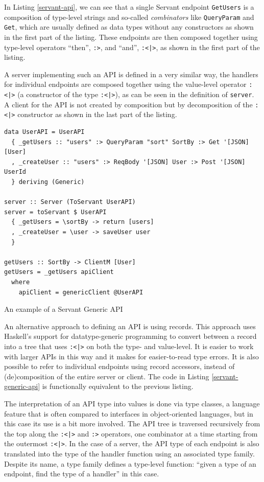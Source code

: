 \documentclass[english,zadani,odsaz]{fitthesis}
\begin{document}
In Listing \ref{servant-api}, we can see that a single Servant endpoint \texttt{GetUsers} is a
composition of type-level strings and so-called \emph{combinators} like \texttt{QueryParam} and
\texttt{Get}, which are usually defined as data types without any constructors as shown
in the first part of the listing. These endpoints are then composed together
using type-level operators ``then'', \texttt{:>}, and ``and'', \texttt{:<|>}, as shown in the first part
of the listing.

A server implementing such an API is defined in a very similar way, the handlers
for individual endpoints are composed together using the value-level operator
\texttt{:<|>} (a constructor of the type \texttt{:<|>}), as can be seen in the definition of
\texttt{server}. A client for the API is not created by composition but by decomposition
of the \texttt{:<|>} constructor as shown in the last part of the listing.

\begin{listing}[!bp]
\begin{verbatim}
data UserAPI = UserAPI
  { _getUsers :: "users" :> QueryParam "sort" SortBy :> Get '[JSON] [User]
  , _createUser :: "users" :> ReqBody '[JSON] User :> Post '[JSON] UserId
  } deriving (Generic)

server :: Server (ToServant UserAPI)
server = toServant $ UserAPI
  { _getUsers = \sortBy -> return [users]
  , _createUser = \user -> saveUser user
  }

getUsers :: SortBy -> ClientM [User]
getUsers = _getUsers apiClient
  where
    apiClient = genericClient @UserAPI
\end{verbatim}
\caption{An example of a Servant Generic API \label{servant-generic-api}}
\end{listing}

An alternative approach to defining an API is using records. This approach uses
Haskell's support for datatype-generic programming to convert between a record
into a tree that uses \texttt{:<|>} on both the type- and value-level. It is easier to
work with larger APIs in this way and it makes for easier-to-read type
errors. It is also possible to refer to individual endpoints using record
accessors, instead of (de)composition of the entire server or client. The code
in Listing \ref{servant-generic-api} is functionally equivalent to the previous listing.

The interpretation of an API type into values is done via type classes, a
language feature that is often compared to interfaces in object-oriented
languages, but in this case its use is a bit more involved. The API tree is
traversed recursively from the top along the \texttt{:<|>} and \texttt{:>} operators, one
combinator at a time starting from the outermost \texttt{:<|>}. In the case of a server,
the API type of each endpoint is also translated into the type of the handler
function using an associated type family. Despite its name, a type family
defines a type-level function: ``given a type of an endpoint, find the type of a
handler'' in this case.
\end{document}
